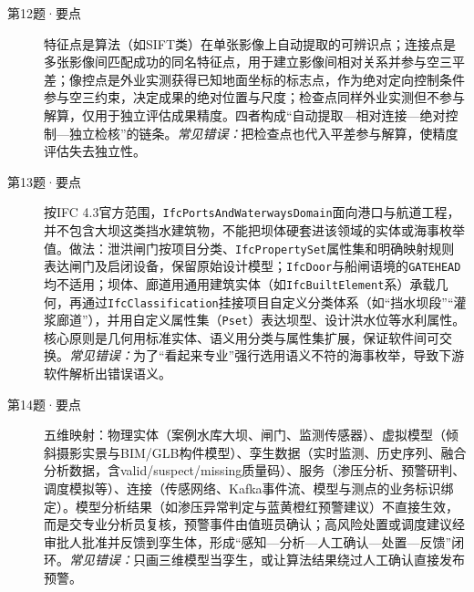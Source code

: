 \begin{description}
  \item[第12题·要点] 特征点是算法（如SIFT类）在单张影像上自动提取的可辨识点；连接点是多张影像间匹配成功的同名特征点，用于建立影像间相对关系并参与空三平差；像控点是外业实测获得已知地面坐标的标志点，作为绝对定向控制条件参与空三约束，决定成果的绝对位置与尺度；检查点同样外业实测但不参与解算，仅用于独立评估成果精度。四者构成“自动提取—相对连接—绝对控制—独立检核”的链条。\textit{常见错误：}把检查点也代入平差参与解算，使精度评估失去独立性。
  \item[第13题·要点] 按IFC 4.3官方范围，\texttt{IfcPortsAndWaterwaysDomain}面向港口与航道工程，并不包含大坝这类挡水建筑物，不能把坝体硬套进该领域的实体或海事枚举值。做法：泄洪闸门按项目分类、\texttt{IfcPropertySet}属性集和明确映射规则表达闸门及启闭设备，保留原始设计模型；\texttt{IfcDoor}与船闸语境的\texttt{GATEHEAD}均不适用；坝体、廊道用通用建筑实体（如\texttt{IfcBuiltElement}系）承载几何，再通过\texttt{IfcClassification}挂接项目自定义分类体系（如“挡水坝段”“灌浆廊道”），并用自定义属性集（\texttt{Pset}）表达坝型、设计洪水位等水利属性。核心原则是几何用标准实体、语义用分类与属性集扩展，保证软件间可交换。\textit{常见错误：}为了“看起来专业”强行选用语义不符的海事枚举，导致下游软件解析出错误语义。
  \item[第14题·要点] 五维映射：物理实体（案例水库大坝、闸门、监测传感器）、虚拟模型（倾斜摄影实景与BIM/GLB构件模型）、孪生数据（实时监测、历史序列、融合分析数据，含valid/suspect/missing质量码）、服务（渗压分析、预警研判、调度模拟等）、连接（传感网络、Kafka事件流、模型与测点的业务标识绑定）。模型分析结果（如渗压异常判定与蓝黄橙红预警建议）不直接生效，而是交专业分析员复核，预警事件由值班员确认；高风险处置或调度建议经审批人批准并反馈到孪生体，形成“感知—分析—人工确认—处置—反馈”闭环。\textit{常见错误：}只画三维模型当孪生，或让算法结果绕过人工确认直接发布预警。
\end{description}

